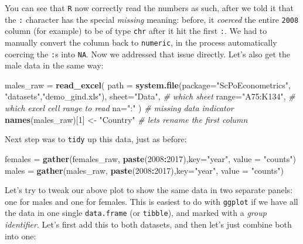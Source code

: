 \documentclass[]{book}
\newenvironment{Shaded}{\begin{snugshade}}{\end{snugshade}}
\newcommand{\KeywordTok}[1]{\textcolor[rgb]{0.13,0.29,0.53}{\textbf{#1}}}
\newcommand{\DataTypeTok}[1]{\textcolor[rgb]{0.13,0.29,0.53}{#1}}
\newcommand{\DecValTok}[1]{\textcolor[rgb]{0.00,0.00,0.81}{#1}}
\newcommand{\StringTok}[1]{\textcolor[rgb]{0.31,0.60,0.02}{#1}}
\newcommand{\CommentTok}[1]{\textcolor[rgb]{0.56,0.35,0.01}{\textit{#1}}}
\newcommand{\OperatorTok}[1]{\textcolor[rgb]{0.81,0.36,0.00}{\textbf{#1}}}
\newcommand{\NormalTok}[1]{#1}
\theoremstyle{definition}
\theoremstyle{definition}
\theoremstyle{definition}
\theoremstyle{remark}
\begin{document}
You can see that \texttt{R} now correctly read the numbers as such,
after we told it that the \texttt{:} character has the special
\emph{missing} meaning: before, it \emph{coerced} the entire
\texttt{2008} column (for example) to be of type \texttt{chr} after it
hit the first \texttt{:}. We had to manually convert the column back to
\texttt{numeric}, in the process automatically coercing the \texttt{:}s
into \texttt{NA}. Now we addressed that issue directly. Let's also get
the male data in the same way:

\begin{Shaded}
\begin{Highlighting}[]
\NormalTok{males_raw =}\StringTok{ }\KeywordTok{read_excel}\NormalTok{(}
                \DataTypeTok{path =} \KeywordTok{system.file}\NormalTok{(}\DataTypeTok{package=}\StringTok{"ScPoEconometrics"}\NormalTok{,}
                                    \StringTok{"datasets"}\NormalTok{,}\StringTok{"demo_gind.xls"}\NormalTok{), }
                \DataTypeTok{sheet=}\StringTok{"Data"}\NormalTok{, }\CommentTok{# which sheet}
                \DataTypeTok{range=}\StringTok{"A75:K134"}\NormalTok{,  }\CommentTok{# which excel cell range to read}
                \DataTypeTok{na=}\StringTok{":"}\NormalTok{ )   }\CommentTok{# missing data indicator}
\KeywordTok{names}\NormalTok{(males_raw)[}\DecValTok{1}\NormalTok{] <-}\StringTok{ "Country"}   \CommentTok{# lets rename the first column}
\end{Highlighting}
\end{Shaded}

Next step was to \texttt{tidy} up this data, just as before:

\begin{Shaded}
\begin{Highlighting}[]
\NormalTok{females =}\StringTok{ }\KeywordTok{gather}\NormalTok{(females_raw, }\KeywordTok{paste}\NormalTok{(}\DecValTok{2008}\OperatorTok{:}\DecValTok{2017}\NormalTok{),}\DataTypeTok{key=}\StringTok{"year"}\NormalTok{, }\DataTypeTok{value =} \StringTok{"counts"}\NormalTok{)}
\NormalTok{males =}\StringTok{ }\KeywordTok{gather}\NormalTok{(males_raw, }\KeywordTok{paste}\NormalTok{(}\DecValTok{2008}\OperatorTok{:}\DecValTok{2017}\NormalTok{),}\DataTypeTok{key=}\StringTok{"year"}\NormalTok{, }\DataTypeTok{value =} \StringTok{"counts"}\NormalTok{)}
\end{Highlighting}
\end{Shaded}

Let's try to tweak our above plot to show the same data in two separate
panels: one for males and one for females. This is easiest to do with
\texttt{ggplot} if we have all the data in one single
\texttt{data.frame} (or \texttt{tibble}), and marked with a \emph{group
identifier}. Let's first add this to both datasets, and then let's just
combine both into one:
\end{document}
